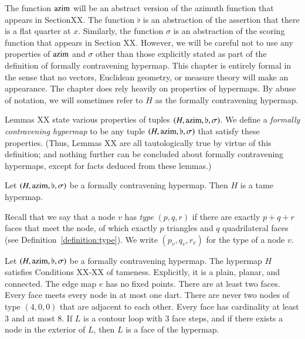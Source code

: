 The function ${\operatorname{azim}}$ will be an abstract version of the azimuth
function that appears in SectionXX.  The function $\flat$ is an
abstraction of the assertion that there is a flat quarter at $x$.
Similarly, the function $\sigma$ is an abstraction of the scoring
function that appears in Section XX. However, we will be careful not
to use any properties of ${\operatorname{azim}}$ and $\sigma$ other than those
explicitly stated as part of the definition of formally contravening
hypermap. This chapter is entirely formal in the sense that no
vectors, Euclidean geometry, or measure theory will make an
appearance.  The chapter does rely heavily on properties of
hypermaps.  By abuse of notation, we will sometimes refer to $H$ as
the formally contravening hypermap.

\begin{definition}  Lemmas XX state various properties of tuples
$(H,{\operatorname{azim}},\flat,\sigma)$.  We define a {\it formally contravening
hypermap\/} to be any tuple $(H,{\operatorname{azim}},\flat,\sigma)$ that satisfy
these properties.  (Thus, Lemmas XX are all tautologically true by
virtue of this definition; and nothing further can be concluded
about formally contravening hypermaps, except for facts deduced from
these lemmas.)
\end{definition}

\begin{theorem} \label{theorem:contravene}
Let $(H,{\operatorname{azim}},\flat,\sigma)$ be a formally contravening hypermap.
Then $H$ is a tame hypermap.
\end{theorem}

Recall that we say that a node $v$ has {\it type\/} $(p,q,r)$ if
there are exactly $p+q+r$ faces that meet the node, of which exactly
$p$ triangles and $q$ quadrilateral faces (see
Definition~\ref{definition:type}).  We write $(p_v,q_v,r_v)$ for the
type of a node $v$.



\begin{lemma}  Let $(H,{\operatorname{azim}},\flat,\sigma)$ be a formally contravening
hypermap.  The hypermap $H$ satisfies Conditions XX-XX of tameness.
Explicitly, it is a plain, planar, and connected. The edge map $e$
has no fixed points. There are at least two faces. Every face meets
every node in at most one dart.  There are never two nodes of type
$(4,0,0)$ that are adjacent to each other.  Every face has
cardinality at least $3$ and at most $8$.  If $L$ is a contour loop
with $3$ face steps, and if there exists a node in the exterior of
$L$, then $L$ is a face of the hypermap.
\end{lemma}

